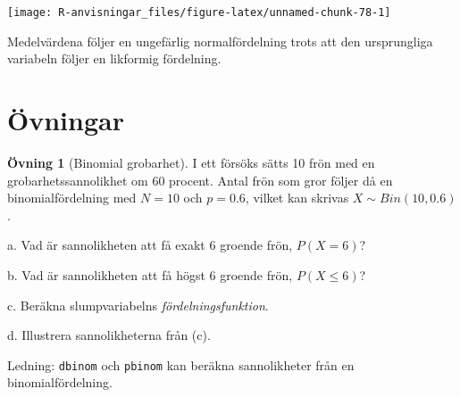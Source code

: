 \documentclass[
]{book}
\theoremstyle{definition}
\theoremstyle{definition}
\theoremstyle{definition}
\newtheorem{exercise}{Övning}[chapter]
\theoremstyle{definition}
\theoremstyle{remark}
\begin{document}
\begin{center}\texttt{[image: R-anvisningar\_files/figure-latex/unnamed-chunk-78-1]} \end{center}

Medelvärdena följer en ungefärlig normalfördelning trots att den ursprungliga variabeln följer en likformig fördelning.

\hypertarget{uxf6vningar-1}{%
\section{Övningar}\label{uxf6vningar-1}}

\begin{exercise}[Binomial grobarhet]
I ett försöks sätts 10 frön med en grobarhetssannolikhet om 60 procent. Antal frön som gror följer då en binomialfördelning med \(N = 10\) och \(p = 0.6\), vilket kan skrivas \(X \sim Bin(10, 0.6)\).

a. Vad är sannolikheten att få exakt 6 groende frön, \(P(X = 6)\)?

b. Vad är sannolikheten att få högst 6 groende frön, \(P(X \leq 6)\)?

c. Beräkna slumpvariabelns \emph{fördelningsfunktion}.

d. Illustrera sannolikheterna från (c).

Ledning: \texttt{dbinom} och \texttt{pbinom} kan beräkna sannolikheter från en binomialfördelning.
\end{exercise}
\end{document}
